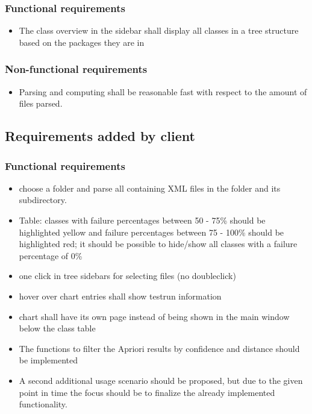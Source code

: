 \subsubsection{Functional requirements}
\begin{itemize}
	\item The class overview in the sidebar shall display all classes in a tree structure based on the packages they are in
\end{itemize}

\subsubsection{Non-functional requirements}
\begin{itemize}
	\item Parsing and computing shall be reasonable fast with respect to the amount of files parsed.
\end{itemize}
\subsection{Requirements added by client}
\subsubsection{Functional requirements}

\begin{itemize}

\item choose a folder and parse all containing XML files in the folder and its subdirectory.

\item Table: classes with failure percentages between 50 - 75\% should be highlighted yellow and failure percentages between 75 - 100\% should be highlighted red; it should be possible to hide/show all classes with a failure percentage of 0\%

\item one click in tree sidebars for selecting files (no doubleclick)
\item hover over chart entries shall show testrun information
\item chart shall have its own page instead of being shown in the main window below the class table
\item The functions to filter the Apriori results by confidence and distance should be implemented

\item A second additional usage scenario should be proposed, but due to the given point in time the focus should be to finalize the already implemented functionality.

\end{itemize}

